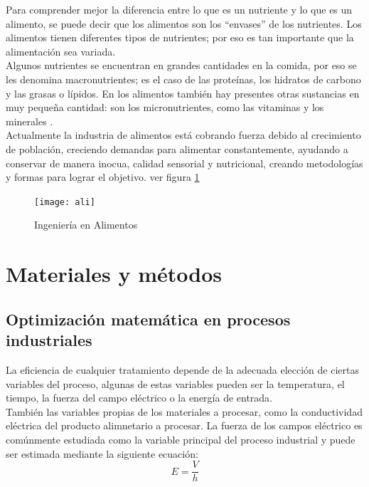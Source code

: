 \documentclass[12pt,a4paper]{article}
\begin{document}
Para comprender mejor la diferencia entre lo que es un nutriente y lo que es un alimento, se puede decir que los alimentos son los “envases” de los nutrientes. Los alimentos tienen diferentes tipos de nutrientes; por eso es tan importante que la alimentación sea variada\cite{Montes2005}.\\ 

Algunos nutrientes se encuentran en grandes cantidades en la comida, por eso se les denomina macronutrientes; es el caso de las proteínas, los hidratos de carbono y las grasas o lípidos. En los alimentos también hay presentes otras sustancias en muy pequeña cantidad: son los micronutrientes, como las vitaminas y los minerales \cite{Luzt1979}.\\

Actualmente la industria de alimentos está cobrando fuerza debido al crecimiento de población, creciendo demandas para alimentar constantemente, ayudando a conservar de manera inocua, calidad sensorial y nutricional, creando metodologías y formas para lograr el objetivo. ver figura \ref{fig:ali} \\

\begin{figure}[h!]
\centering
\texttt{[image: ali]}
\caption{Ingeniería en Alimentos}
\label{fig:ali}
\end{figure}
\newpage
\section{Materiales y métodos}
\subsection{Optimización matemática en procesos industriales}
La eficiencia de cualquier tratamiento depende de la adecuada elección de ciertas variables del proceso, algunas de estas variables pueden ser la temperatura, el tiempo, la fuerza del campo eléctrico o la energía de entrada\cite{Sacancela2000}. \\

También las variables propias de los materiales a procesar, como la conductividad eléctrica del producto alimnetario a procesar.\cite{Ibarz2005} La fuerza de los campos eléctrico es comúnmente estudiada como la variable principal del proceso industrial y puede ser estimada mediante la siguiente ecuación:\\

\begin{equation}
E= \frac{V}{h}
\end{equation}
\end{document}
